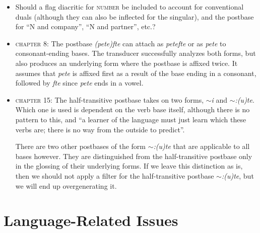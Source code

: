 \documentclass{article}
\begin{document}
\begin{itemize}
\renewcommand\labelitemi{$\cdot$}

\item Should a flag diacritic for \textsc{number} be included to account for conventional duals (although they can also be inflected for the singular), and the postbase for ``N and company'', ``N and partner'', etc.?

\item \textsc{chapter 8}: The postbase \textit{(pete)fte} can attach as \textit{petefte} or as \textit{pete} to consonant-ending bases.
%
The transducer successfully analyzes both forms, but also produces an underlying form where the postbase is affixed twice.
%
It assumes that \textit{pete} is affixed first as a result of the base ending in a consonant, followed by \textit{fte} since \textit{pete} ends in a vowel.

\item \textsc{chapter 15}: The half-transitive postbase takes on two forms, \textit{$\sim$i} and \textit{$\sim$:(u)te}.
%
Which one is used is dependent on the verb base itself, although there is no pattern to this, and ``a learner of the language must just learn which these verbs are; there is no way from the outside to predict''.

There are two other postbases of the form \textit{$\sim$:(u)te} that are applicable to all bases however.
%
They are distinguished from the half-transitive postbase only in the glossing of their underlying forms.
%
If we leave this distinction as is, then we should not apply a filter for the half-transitive postbase \textit{$\sim$:(u)te}, but we will end up overgenerating it.

\end{itemize}


\section{Language-Related Issues}
\end{document}
